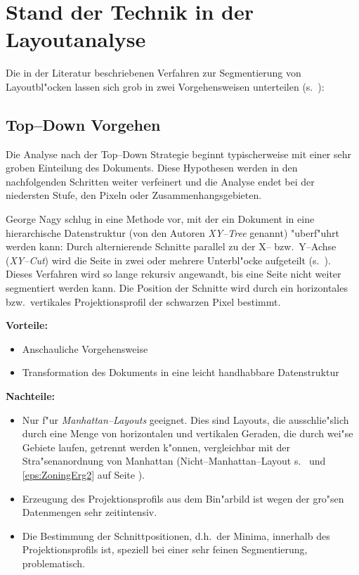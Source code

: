 \section{Stand der Technik in der Layoutanalyse}\label{LayoutanalyseMethoden}

Die in der Literatur beschriebenen Verfahren zur Segmentierung von Layoutbl"ocken
lassen sich grob in zwei Vorgehensweisen unterteilen (s.\ ):


\subsection{Top--Down Vorgehen}\label{XYCutTheroie}

Die Analyse nach der Top--Down Strategie beginnt typischerweise mit einer sehr groben
Einteilung des Dokuments.
Diese Hypothesen werden in den nachfolgenden Schritten weiter verfeinert und die Analyse endet
bei der niedersten Stufe, den Pixeln oder Zusammenhangsgebieten.

George Nagy schlug in \cite{Nagy84} eine Methode vor, mit der ein
Dokument in eine hierarchische Datenstruktur (von den Autoren {\em XY--Tree\/} genannt)
"uberf"uhrt werden kann:
Durch alternierende Schnitte parallel zu der X-- bzw.\ Y--Achse ({\em XY--Cut\/}) wird die Seite in zwei oder mehrere Unterbl"ocke aufgeteilt (s.\ ).
Dieses Verfahren wird so lange rekursiv angewandt, bis eine Seite nicht weiter segmentiert werden
kann. Die Position der Schnitte wird durch ein horizontales bzw.\ vertikales Projektionsprofil
der schwarzen Pixel bestimmt.


{\bf Vorteile:}
\begin{itemize}
  \item Anschauliche Vorgehensweise
  \item Transformation des Dokuments in eine leicht handhabbare Datenstruktur
\end{itemize}

{\bf Nachteile:}
\begin{itemize}
  \item Nur f"ur {\em Manhattan--Layouts} geeignet. Dies sind Layouts, die ausschlie"slich
        durch eine Menge von horizontalen und vertikalen Geraden, die durch wei"se Gebiete laufen,
        getrennt werden k"onnen, vergleichbar mit der Stra"senanordnung von Manhattan
        (Nicht--Manhattan--Layout s.\  und
        \ref{eps:ZoningErg2} auf Seite \pageref{eps:ZoningErg2}).

  \item Erzeugung des Projektionsprofils aus dem Bin"arbild ist wegen der gro"sen Datenmengen sehr zeitintensiv.

  \item Die Bestimmung der Schnittpositionen, d.h.\ der Minima, innerhalb des Projektionsprofils
        ist, speziell bei einer sehr feinen Segmentierung, problematisch.

\end{itemize}

